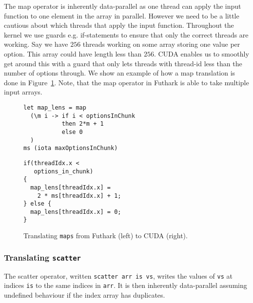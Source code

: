 The map operator is inherently data-parallel as one thread
can apply the input function to one element in the array in
parallel. However we need to be a little cautious 
about which threads that apply the input function. 
Throughout the kernel we use guards e.g. if-statements 
to ensure that only the correct threads are working.
Say we have $256$ threads working on some array storing one value
per option. This array could have length less than $256$. CUDA 
enables us to smoothly get around this with a guard that only
lets threads with thread-id less than the number of options through.
We show an example of how a map translation is done in
Figure~\ref{fig:trans_map}. Note, that the map operator 
in Futhark is able to take multiple input arrays.
%
\begin{figure}[bt]
\begin{center}
\begin{minipage}[t]{0.45\linewidth}
\vspace{0pt}
\begin{lstlisting}
let map_lens = map
  (\m i -> if i < optionsInChunk
           then 2*m + 1
           else 0
  )
ms (iota maxOptionsInChunk)
\end{lstlisting}
\end{minipage}
\begin{minipage}[t]{0.45\linewidth}
\vspace{0pt}
\begin{lstlisting}
if(threadIdx.x <
   options_in_chunk)
{
  map_lens[threadIdx.x] =
    2 * ms[threadIdx.x] + 1;
} else {
  map_lens[threadIdx.x] = 0;
}
\end{lstlisting}
\end{minipage}
\caption{Translating \texttt{maps} from Futhark (left) to
  CUDA (right).}
\label{fig:trans_map}
\end{center}
\end{figure}
%




\subsubsection{Translating \texttt{scatter}}

The scatter operator, written \lstinline{scatter arr is vs},
writes the values of \lstinline{vs} at indices
\lstinline{is} to the same indices in \lstinline{arr}. It is
then inherently data-parallel assuming undefined behaviour
if the index array has duplicates.

